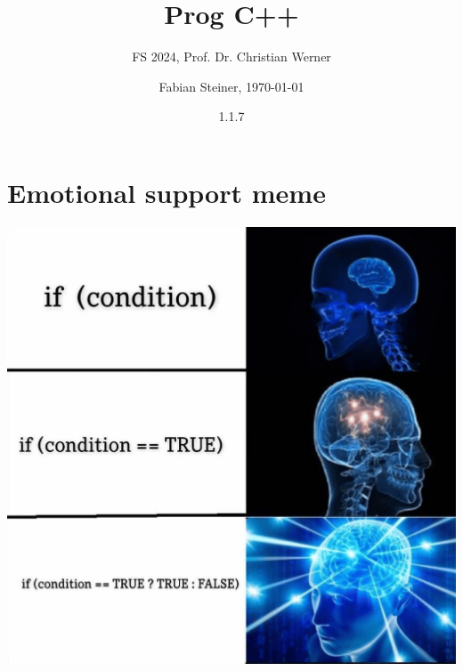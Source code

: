 \documentclass[fontsize=8pt, a4paper, fleqn, landscape, DIV=calc]{scrartcl}
\title{\vspace{-1cm}Prog C++}
\subtitle{FS 2024, Prof. Dr. Christian Werner}
\author{Fabian Steiner, \today}
\date{{\small 1.1.7}}
\begin{document}
	\begin{multicols*}{3}
        \raggedcolumns
        \begin{minipage}{0.75\columnwidth}
		      \maketitle
        \end{minipage}
        \begin{minipage}{0.2\columnwidth}
            \begin{center}
                \quad
                \qquad    
            \end{center}
        \end{minipage}
        
        \thispagestyle{fancy}%

        
        
        
        
        
        \section{Emotional support meme}
        
        \begin{center}
            \includegraphics[width=\columnwidth]{pictures/ifcondition.png}  
        \end{center}            

	\end{multicols*}
\end{document}
